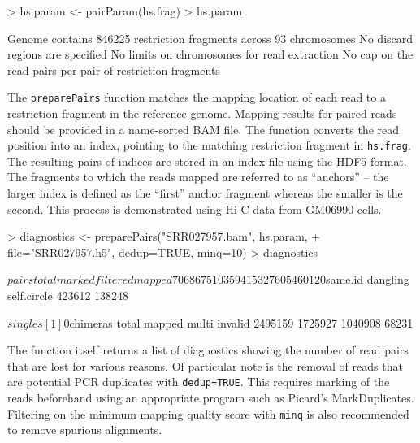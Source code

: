 \documentclass[12pt]{report}
\renewenvironment{Schunk}{\vspace{0pt}}{\vspace{0pt}}
\newcommand{\code}[1]{{\small\texttt{#1}}}
\begin{document}
\begin{Schunk}
\begin{Sinput}
> hs.param <- pairParam(hs.frag)
> hs.param
\end{Sinput}
\begin{Soutput}
Genome contains 846225 restriction fragments across 93 chromosomes
No discard regions are specified
No limits on chromosomes for read extraction
No cap on the read pairs per pair of restriction fragments
\end{Soutput}
\end{Schunk}

The \code{preparePairs} function matches the mapping location of each read to a restriction fragment in the reference genome.
Mapping results for paired reads should be provided in a name-sorted BAM file.
The function converts the read position into an index, pointing to the matching restriction fragment in \code{hs.frag}.
The resulting pairs of indices are stored in an index file using the HDF5 format.
The fragments to which the reads mapped are referred to as ``anchors'' -- the larger index is defined as the ``first'' anchor fragment whereas the smaller is the second.
This process is demonstrated using Hi-C data from GM06990 cells.

\begin{Schunk}
\begin{Sinput}
> diagnostics <- preparePairs("SRR027957.bam", hs.param, 
+     file="SRR027957.h5", dedup=TRUE, minq=10)
> diagnostics
\end{Sinput}
\begin{Soutput}
$pairs
   total   marked filtered   mapped 
 7068675   103594  1532760  5460120 

$same.id
   dangling self.circle 
     423612      138248 

$singles
[1] 0

$chimeras
  total  mapped   multi invalid 
2495159 1725927 1040908   68231 
\end{Soutput}
\end{Schunk}

The function itself returns a list of diagnostics showing the number of read pairs that are lost for various reasons.
Of particular note is the removal of reads that are potential PCR duplicates with \code{dedup=TRUE}.
This requires marking of the reads beforehand using an appropriate program such as Picard's \textsf{MarkDuplicates}.
Filtering on the minimum mapping quality score with \code{minq} is also recommended to remove spurious alignments.
\end{document}
